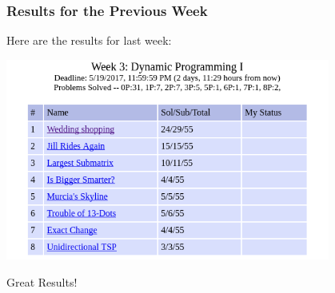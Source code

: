 \begin{frame}
  \frametitle{Results for the Previous Week}

  \begin{center}
    Here are the results for last week:

    \bigskip
    
    \includegraphics[width=0.8\textwidth]{img/resultsW3}

    \bigskip
    
    Great Results!
    
  \end{center}
\end{frame}

